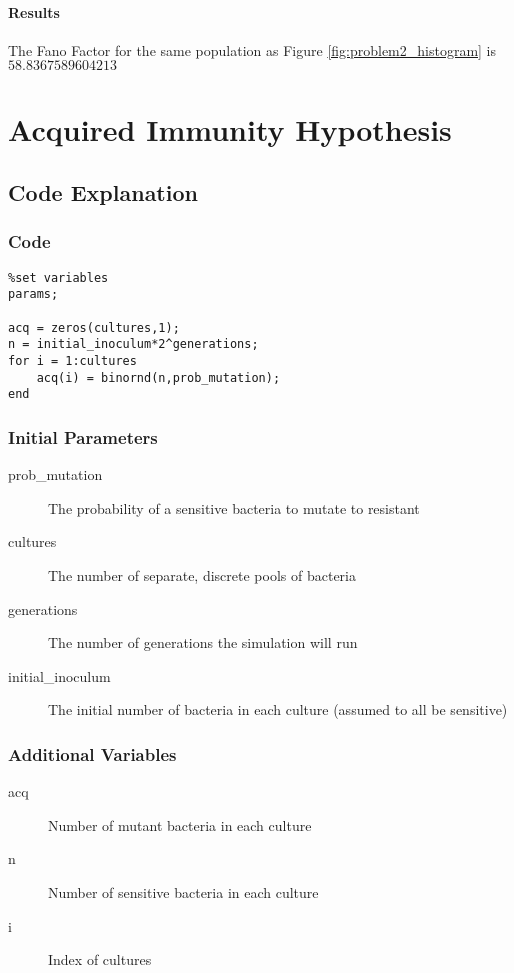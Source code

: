 \documentclass[titlepage]{scrreprt}
\begin{document}
\subsubsection{Results}
The Fano Factor for the same population as Figure \ref{fig:problem2_histogram} is $58.8367589604213$
\chapter{Acquired Immunity Hypothesis}
\section{Code Explanation}
\subsection{Code}
\begin{verbatim}
%set variables
params;

acq = zeros(cultures,1);
n = initial_inoculum*2^generations;
for i = 1:cultures
    acq(i) = binornd(n,prob_mutation);
end
\end{verbatim}
\subsection{Initial Parameters}
\begin{description}
    \item[prob\_mutation] The probability of a sensitive bacteria to mutate to resistant
    \item[cultures] The number of separate, discrete pools of bacteria
    \item[generations] The number of generations the simulation will run
    \item[initial\_inoculum] The initial number of bacteria in each culture (assumed to all be sensitive)
\end{description}
\subsection{Additional Variables}
\begin{description}
    \item[acq] Number of mutant bacteria in each culture
    \item[n] Number of sensitive bacteria in each culture
    \item[i] Index of cultures 
\end{description}
\end{document}
